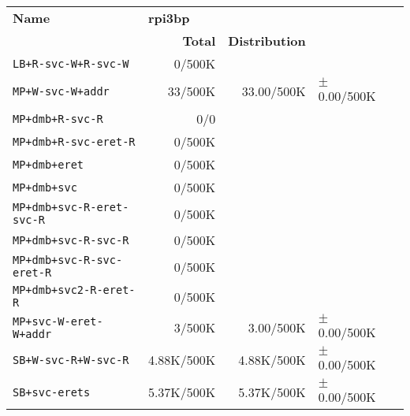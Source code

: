 \begin{tabular}{l  | r r l l}
   \textbf{Name}                  & \multicolumn{3}{l}{\textbf{rpi3bp}}                       & \\
                                  & \textbf{Total} & \textbf{Distribution} &                 & \\
        \verb|LB+R-svc-W+R-svc-W| &         0/500K &                       &                 & \\ \hline 
           \verb|MP+W-svc-W+addr| &        33/500K &            33.00/500K & $\pm$ 0.00/500K & \\ \hline 
            \verb|MP+dmb+R-svc-R| &            0/0 &                       &                 & \\ \hline 
       \verb|MP+dmb+R-svc-eret-R| &         0/500K &                       &                 & \\ \hline 
               \verb|MP+dmb+eret| &         0/500K &                       &                 & \\ \hline 
                \verb|MP+dmb+svc| &         0/500K &                       &                 & \\ \hline 
   \verb|MP+dmb+svc-R-eret-svc-R| &         0/500K &                       &                 & \\ \hline 
        \verb|MP+dmb+svc-R-svc-R| &         0/500K &                       &                 & \\ \hline 
   \verb|MP+dmb+svc-R-svc-eret-R| &         0/500K &                       &                 & \\ \hline 
      \verb|MP+dmb+svc2-R-eret-R| &         0/500K &                       &                 & \\ \hline 
      \verb|MP+svc-W-eret-W+addr| &         3/500K &             3.00/500K & $\pm$ 0.00/500K & \\ \hline 
        \verb|SB+W-svc-R+W-svc-R| &     4.88K/500K &            4.88K/500K & $\pm$ 0.00/500K & \\ \hline 
              \verb|SB+svc-erets| &     5.37K/500K &            5.37K/500K & $\pm$ 0.00/500K & \\ \hline 
\end{tabular}
